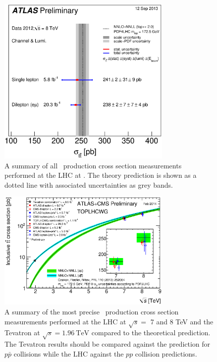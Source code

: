 {\begin{figure}[htbp]
  \centering
  \includegraphics[width=0.75\textwidth]{PartTopQuark/Plots/tt_xsec_8TeV.eps}
  \caption{A summary of all \ttbar\ production cross section measurements performed at the LHC at \cmsE. The theory prediction is shown as a dotted line with associated uncertainties as grey bands.}
  \label{fig:TopQuarkPairProduction8TeV}
\end{figure}

\begin{figure}[htbp]
  \centering
  \includegraphics[width=0.75\textwidth]{PartTopQuark/Plots/tt_xsec_vsroots.eps}
  \caption[A summary of the most precise \ttbar\ production cross section measurements performed at the LHC at $\sqrt{s}=$ 7 and 8 TeV and the Tevatron at $\sqrt{s}=\SI{1.96}{\TeV}$ compared to the theoretical prediction.]{A summary of the most precise \ttbar\ production cross section measurements performed at the LHC at $\sqrt{s}=$ 7 and 8 TeV and the Tevatron at $\sqrt{s}=\SI{1.96}{\TeV}$ compared to the theoretical prediction. The Tevatron results should be compared against the prediction for $p\bar{p}$ collisions while the LHC against the $pp$ collision predictions.}
  \label{fig:TopQuarkPairProductionComparison}
\end{figure}

}
